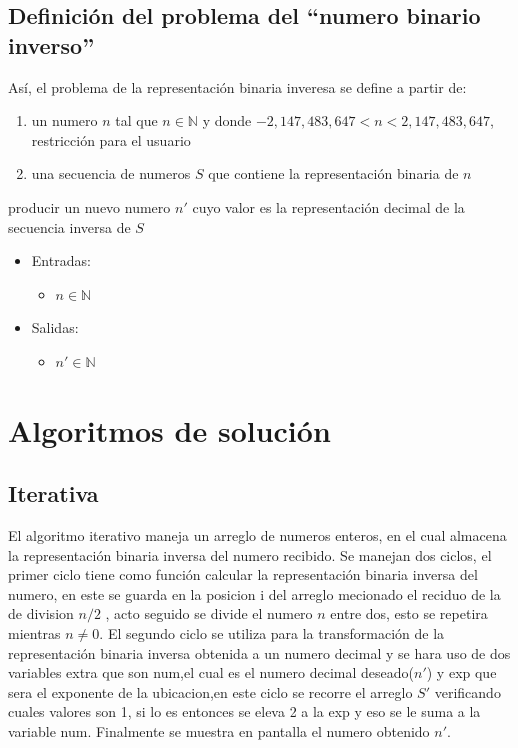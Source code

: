 \documentclass[letter]{article}
\begin{document}
\subsection{Definición del problema del ``numero binario inverso''} \label{problema}
Así, el problema de la representación binaria inveresa se define a partir de:
  \begin{enumerate}
    \item un numero $n$ tal que $n\in \mathbb{N}$ y donde $-2,147,483,647<n<2,147,483,647$, restricción para el usuario
    \item una secuencia de numeros $S$ que contiene la representación binaria de $n$
  \end{enumerate}
producir un nuevo numero $n'$ cuyo valor es la representación decimal de la secuencia inversa de $S$
\begin{itemize}
    \item Entradas:
    \begin{itemize}
        \item $n\in \mathbb{N}$
    \end{itemize}
    \item Salidas:
    \begin{itemize}
        \item $n'\in \mathbb{N}$
    \end{itemize}
\end{itemize}

\section{Algoritmos de solución} \label{algoritmos}
\subsection{Iterativa}
El algoritmo iterativo maneja un arreglo de numeros enteros, en el cual almacena la representación binaria inversa del numero recibido. Se manejan dos ciclos, el primer ciclo tiene como función calcular la representación binaria inversa del numero, en este se guarda en la posicion i del arreglo mecionado el reciduo de la de division $n/2$ , acto seguido se divide el numero $n$ entre dos, esto se repetira mientras $n \neq 0$. El segundo ciclo se utiliza para la transformación de la representación binaria inversa obtenida a un numero decimal y se hara uso de dos variables extra que son num,el cual es el numero decimal deseado($n'$) y exp que sera el exponente de la ubicacion,en este ciclo se recorre el arreglo $S'$ verificando cuales valores son 1, si lo es entonces se eleva 2 a la exp y eso se le suma a la variable num. Finalmente se muestra en pantalla el numero obtenido  $n'$.
\end{document}
